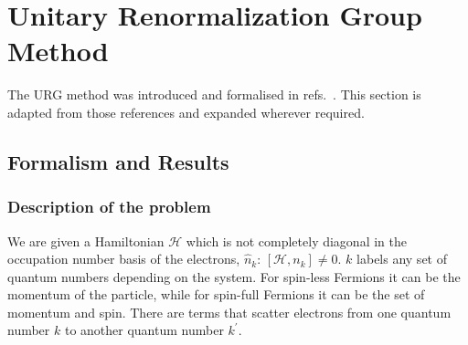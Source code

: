 \chapter{Unitary Renormalization Group Method}\label{urgform}
The URG method was introduced and formalised in refs.~\cite{anirbanurg1,anirbanurg2,anirbanmott1,anirbanmott2}.  This section is adapted from those references and expanded wherever required.
\section{Formalism and Results}
\subsection{Description of the problem}
We are given a Hamiltonian \(\mathcal{H}\) which is not completely diagonal in the occupation number basis of the electrons, \(\hat n_k\): \(\left[\mathcal{H},n_k\right] \neq 0\). \(k\) labels any set of quantum numbers depending on the system. For spin-less Fermions it can be the momentum of the particle, while for spin-full Fermions it can be the set of momentum and spin. There are terms that scatter electrons from one quantum number \(k\) to another quantum number \(k^\prime\).

